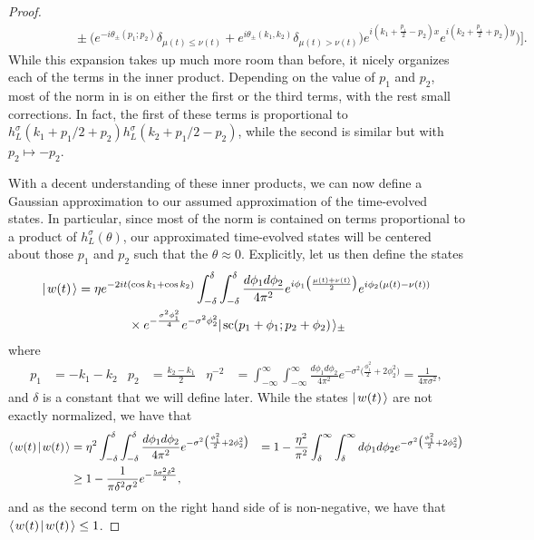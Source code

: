 \documentclass[../thesis-main/thesis-main]{subfiles}
\begin{document}
\begin{proof}
\begin{align}
  &\qquad\qquad \pm \Big(e^{-i\theta_{\pm}(p_1;p_2)}\delta_{\mu(t)\leq\nu(t)} + e^{i  \theta_{\pm}(k_1,k_2)}\delta_{\mu(t) > \nu(t)}\Big) e^{i (k_1 + \frac{p_1}{2} - p_2)x}e^{i(k_2 + \frac{p_1}{2} + p_2)y}\bigg)\Bigg].\label{eq:alpha_scat_ip}
\end{align}
While this expansion takes up much more room than before, it nicely organizes each of the terms in the inner product.  Depending on the value of $p_1$ and $p_2$, most of the norm in  is on either the first or the third terms, with the rest small corrections.  In fact, the first of these terms is proportional to $h_{L}^\sigma (k_1+p_1/2 + p_2) h_L^\sigma(k_2+p_1/2- p_2)$, while the second is similar but with $p_2\mapsto -p_2$.

With a decent understanding of these inner products, we can now define a Gaussian approximation to our assumed approximation of the time-evolved states.  In particular, since most of the norm is contained on terms proportional to a product of $h_L^\sigma(\theta)$, our approximated time-evolved states will be centered about those $p_1$ and $p_2$ such that the $\theta \approx 0$.  Explicitly, let us then define the states
\begin{align}
  |\mspace{2mu} w(t) \mspace{2mu} \rangle &= \eta e^{ - 2 i t (\cos k_1 + \cos k_2)} \int_{-\delta}^\delta \int_{-\delta}^\delta \frac{d\phi_1 d\phi_2}{4\pi^2} e^{i \phi_1 \big(\frac{\mu(t) + \nu(t)}{2}\big)} e^{i  \phi_2 (\mu(t) - \nu(t))} \nonumber\\
  &\qquad\qquad \times e^{ -\frac{ \sigma^2 \phi_1^2}{4}} e^{ -\sigma^2 \phi_2^2} |\mspace{2mu} \text{sc}(p_1 + \phi_1; p_2 + \phi_2) \mspace{2mu} \rangle_{\pm}
\end{align} 
where
\begin{align}
p_1 &= - k_1 - k_2 & p_2 & = \frac{k_2 - k_1}{2} &
  \eta^{-2} &= \int_{-\infty}^\infty \int_{-\infty}^\infty \frac{d\phi_1 d\phi_2}{4\pi^2} e^{ -\sigma^2 \big(\frac{\phi_1^2}{2} + 2 \phi_2^2 \big)} = \frac{1}{4\pi\sigma^2},
\end{align}
and $\delta$ is a constant that we will define later.  While the states $|\mspace{2mu} w(t) \mspace{2mu} \rangle$ are not exactly normalized, we have that
\begin{align}
   \langle\mspace{2mu} w(t) \mspace{2mu} | \mspace{2mu} w(t)\mspace{2mu} \rangle &= \eta^2 \int_{-\delta}^\delta \int_{-\delta}^\delta \frac{d\phi_1d\phi_2}{4\pi^2}  e^{ -\sigma^2 \big(\frac{\phi_1^2}{2} + 2 \phi_2^2 \big)} &= 1  - \frac{\eta^2}{\pi^2} \int_\delta^{\infty} \int_{\delta}^\infty d\phi_1d\phi_2 e^{ - \sigma^2 \big(\frac{\phi_1^2}{2} + 2 \phi_2^2\big)}\label{eq:w_norm}\\
   & \geq  1 - \frac{1}{\pi \delta^2 \sigma^2}e^{- \frac{5 \sigma^2 \delta^2}{2}},
\end{align}
and as the second term on the right hand side of  is non-negative, we have that $\langle\mspace{2mu} w(t) \mspace{2mu} | \mspace{2mu} w(t)\mspace{2mu} \rangle \leq 1$.


\end{proof}
\end{document}
